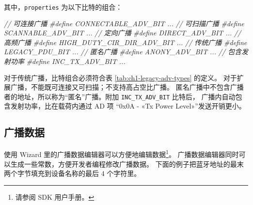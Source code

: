 \documentclass[
  12pt,
]{book}
\newenvironment{Shaded}{\begin{snugshade}}{\end{snugshade}}
\newcommand{\CommentTok}[1]{\textcolor[rgb]{0.56,0.35,0.01}{\textit{#1}}}
\newcommand{\PreprocessorTok}[1]{\textcolor[rgb]{0.56,0.35,0.01}{\textit{#1}}}
\begin{document}
其中，\texttt{properties} 为以下比特的组合：

\begin{Shaded}
\begin{Highlighting}[]
\CommentTok{// 可连接广播}
\PreprocessorTok{\#define    CONNECTABLE\_ADV\_BIT       ...}
\CommentTok{// 可扫描广播}
\PreprocessorTok{\#define    SCANNABLE\_ADV\_BIT         ...}
\CommentTok{// 定向广播}
\PreprocessorTok{\#define    DIRECT\_ADV\_BIT            ...}
\CommentTok{// 高频广播}
\PreprocessorTok{\#define    HIGH\_DUTY\_CIR\_DIR\_ADV\_BIT ...}
\CommentTok{// 传统广播}
\PreprocessorTok{\#define    LEGACY\_PDU\_BIT            ...}
\CommentTok{// 匿名广播}
\PreprocessorTok{\#define    ANONY\_ADV\_BIT             ...}
\CommentTok{// 包含发射功率}
\PreprocessorTok{\#define    INC\_TX\_ADV\_BIT            ...}
\end{Highlighting}
\end{Shaded}

对于传统广播，比特组合必须符合表 \ref{tab:ch1-legacy-adv-types} 的定义。
对于扩展广播，不能既可连接又可扫描；不支持高占空比广播。
匿名广播中不包含广播者的地址，所以称为``匿名''广播。附加 \texttt{INC\_TX\_ADV\_BIT} 比特后，
广播内自动包含发射功率，比在载荷内通过 AD 项 ``0x0A - «Tx Power Level»''发送开销更小。

\hypertarget{ch1-adv-data-edit}{%
\subsection{广播数据}\label{ch1-adv-data-edit}}

使用 Wizard 里的广播数据编辑器可以方便地编辑数据\footnote{请参阅 SDK 用户手册。}。
广播数据编辑器同时可以生成一些常数，方便开发者编程修改广播数据。
下面的例子把蓝牙地址的最末两个字节填充到设备名称的最后 4 个字符里。
\end{document}
